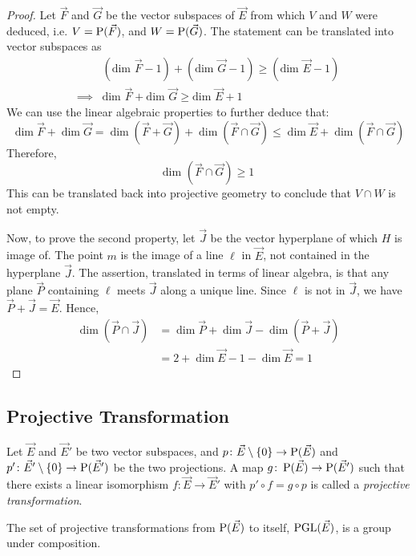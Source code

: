 \begin{proof}
  Let $\vec{F}$ and $\vec{G}$ be the vector subspaces of $\vec{E}$ from which $V$ and $W$ were deduced, i.e.
  $V=\operatorname{P}(\vec{F})$, and $W=\operatorname{P}(\vec{G})$. The statement can be translated into vector subspaces as
  \begin{align*}
    & (\text{dim }\vec{F}-1)+(\text{dim }\vec{G}-1)\ge(\text{dim }\vec{E}-1)\\
    \implies& \text{dim }\vec{F}+\text{dim }\vec{G}\ge\text{dim }\vec{E}+1
  \end{align*}
  We can use the linear algebraic properties to further deduce that:
  \[
    \dim\vec{F}+\dim\vec{G}=\dim(\vec{F}+\vec{G})+\dim(\vec{F}\cap \vec{G})
    \le\dim\vec{E}+\dim(\vec{F}\cap \vec{G})
  \]
  Therefore,
  \[
    \text{dim }(\vec{F}\cap \vec{G})\ge1
  \]
  This can be translated back into projective geometry to conclude that $V\cap W$ is not empty.

  Now, to prove the second property, let $\vec{J}$ be the vector hyperplane of which $H$ is image of.
  The point $m$ is the image of a line $\ell$ in $\vec{E}$, not contained in the hyperplane $\vec{J}$.
  The assertion, translated in terms of linear algebra, is that any plane $\vec{P}$ containing $\ell$
  meets $\vec{J}$ along a unique line. Since $\ell$ is not in $\vec{J}$, we have $\vec{P}+\vec{J}=\vec{E}$. Hence,
  \begin{align*}
    \dim(\vec{P}\cap\vec{J}) &= \dim\vec{P}+\dim\vec{J}-\dim(\vec{P}+\vec{J})\\
                             &= 2+\dim\vec{E}-1-\dim\vec{E}=1
  \end{align*}
\end{proof}

\subsection{Projective Transformation}

\begin{definition}
  Let $\vec{E}$ and $\vec{E}'$ be two vector subspaces, and ${p\colon\vec{E}\setminus\{0\}\to\operatorname{P}(\vec{E})}$ and
  ${p'\colon\vec{E}'\setminus\{0\}\to\operatorname{P}(\vec{E}')}$ be the two projections. A map ${g\colon\operatorname{P}(\vec{E})\to\operatorname{P}(\vec{E}')}$ such that there exists a linear isomorphism
  ${f\colon\vec{E}\to\vec{E}'}$ with $p'\circ f=g\circ p$ is called a \textit{projective transformation}.
\end{definition}

\begin{prop}
  The set of projective transformations from $\operatorname{P}(\vec{E})$ to itself, $\operatorname{PGL}(\vec{E})$, is a group under
  composition.
\end{prop}

